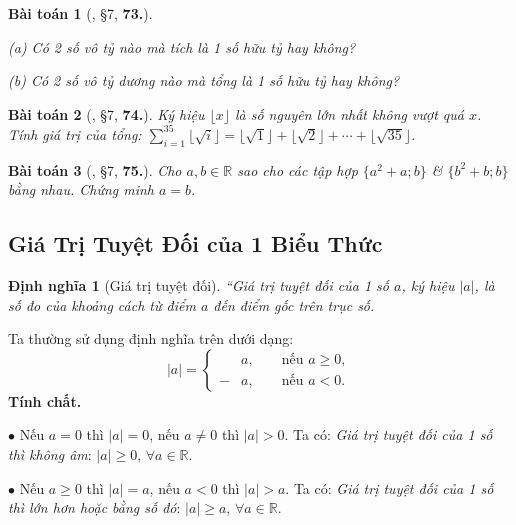 \documentclass{article}
\numberwithin{equation}{section}
\newtheorem{dinhnghia}{Định nghĩa}[section]
\newtheorem{baitoan}{Bài toán}[section]
\begin{document}
\begin{baitoan}[\cite{Binh_Toan_7_tap_1}, \S7, \textbf{73.}]
	\begin{enumerate*}
		\item[(a)] Có 2 số vô tỷ nào mà tích là 1 số hữu tỷ hay không?
		\item[(b)] Có 2 số vô tỷ dương nào mà tổng là 1 số hữu tỷ hay không?
	\end{enumerate*}
\end{baitoan}

\begin{baitoan}[\cite{Binh_Toan_7_tap_1}, \S7, \textbf{74.}]
	Ký hiệu $\lfloor x\rfloor$ là số nguyên lớn nhất không vượt quá $x$. Tính giá trị của tổng: $\sum_{i=1}^{35} \lfloor\sqrt{i}\rfloor = \lfloor\sqrt{1}\rfloor + \lfloor\sqrt{2}\rfloor + \cdots + \lfloor\sqrt{35}\rfloor$.
\end{baitoan}

\begin{baitoan}[\cite{Binh_Toan_7_tap_1}, \S7, \textbf{75.}]
	Cho $a,b\in\mathbb{R}$ sao cho các tập hợp $\{a^2 + a;b\}$ \& $\{b^2 + b;b\}$ bằng nhau. Chứng minh $a = b$.
\end{baitoan}


\subsection{Giá Trị Tuyệt Đối của 1 Biểu Thức}
\begin{dinhnghia}[Giá trị tuyệt đối]
	``\emph{Giá trị tuyệt đối} của 1 số $a$, ký hiệu $|a|$, là số đo của khoảng cách từ điểm $a$ đến điểm gốc trên trục số.
\end{dinhnghia}
Ta thường sử dụng định nghĩa trên dưới dạng:
\begin{equation*}
	|a| = \left\{\begin{split}
		&a,&&\mbox{ nếu }a\ge 0,\\
		-&a,&&\mbox{ nếu }a < 0.
	\end{split}\right.
\end{equation*}
\textbf{Tính chất.}
\begin{enumerate*}
	\item[$\bullet$] Nếu $a = 0$ thì $|a| = 0$, nếu $a\ne 0$ thì $|a| > 0$. Ta có: \textit{Giá trị tuyệt đối của 1 số thì không âm}: $|a|\ge 0$, $\forall a\in\mathbb{R}$.
	\item[$\bullet$] Nếu $a\ge 0$ thì $|a| = a$, nếu $a < 0$ thì $|a| > a$. Ta có: \textit{Giá trị tuyệt đối của 1 số thì lớn hơn hoặc bằng số đó}: $|a|\ge a$, $\forall a\in\mathbb{R}$.
\end{enumerate*}
\end{document}

